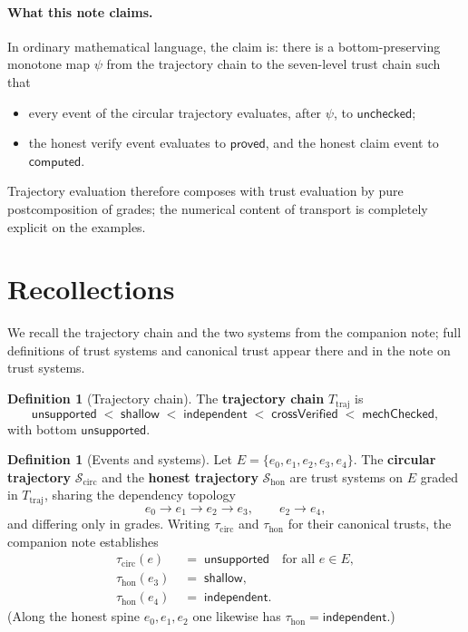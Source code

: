 \documentclass[11pt,a4paper]{article}
\theoremstyle{plain}
\theoremstyle{definition}
\newtheorem{definition}[theorem]{Definition}
\newcommand{\tauu}{\tau}
\begin{document}
\paragraph{What this note claims.}
In ordinary mathematical language, the claim is: there is a bottom-preserving
monotone map $\psi$ from the trajectory chain to the seven-level trust chain
such that
\begin{itemize}
  \item every event of the circular trajectory evaluates, after $\psi$, to
        $\mathsf{unchecked}$;
  \item the honest verify event evaluates to $\mathsf{proved}$, and the
        honest claim event to $\mathsf{computed}$.
\end{itemize}
Trajectory evaluation therefore composes with trust evaluation by pure
postcomposition of grades; the numerical content of transport is completely
explicit on the examples.

\section{Recollections}

We recall the trajectory chain and the two systems from the companion note;
full definitions of trust systems and canonical trust appear there and in
the note on trust systems.

\begin{definition}[Trajectory chain]
The \textbf{trajectory chain} $T_{\mathrm{traj}}$ is
\begin{equation}
  \mathsf{unsupported}
  \;<\;
  \mathsf{shallow}
  \;<\;
  \mathsf{independent}
  \;<\;
  \mathsf{crossVerified}
  \;<\;
  \mathsf{mechChecked},
\end{equation}
with bottom $\mathsf{unsupported}$.
\end{definition}

\begin{definition}[Events and systems]
Let $E = \{e_0, e_1, e_2, e_3, e_4\}$. The \textbf{circular trajectory}
$\mathcal{S}_{\mathrm{circ}}$ and the \textbf{honest trajectory}
$\mathcal{S}_{\mathrm{hon}}$ are trust systems on $E$ graded in
$T_{\mathrm{traj}}$, sharing the dependency topology
\begin{equation}
  e_0 \to e_1 \to e_2 \to e_3,
  \qquad
  e_2 \to e_4,
\end{equation}
and differing only in grades. Writing $\tauu_{\mathrm{circ}}$ and
$\tauu_{\mathrm{hon}}$ for their canonical trusts, the companion note
establishes
\begin{align}
  \tauu_{\mathrm{circ}}(e) &\;=\; \mathsf{unsupported}
  \quad\text{for all } e \in E, \\
  \tauu_{\mathrm{hon}}(e_3) &\;=\; \mathsf{shallow}, \\
  \tauu_{\mathrm{hon}}(e_4) &\;=\; \mathsf{independent}.
\end{align}
(Along the honest spine $e_0, e_1, e_2$ one likewise has
$\tauu_{\mathrm{hon}} = \mathsf{independent}$.)
\end{definition}
\end{document}

